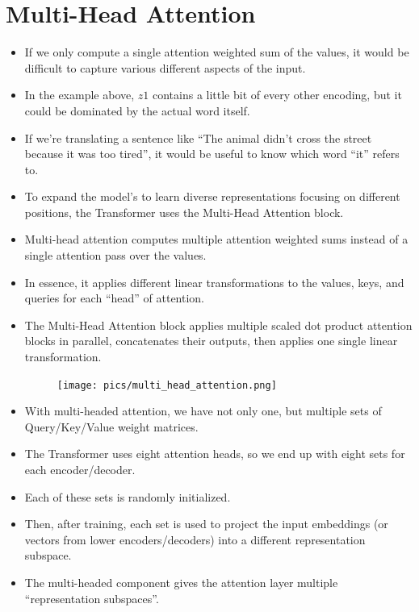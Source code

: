 \section{Multi-Head Attention}
\begin{itemize}
\item If we only compute a single attention weighted sum of the values, it would be difficult to capture various different aspects of the input.
\item In the example above, $z1$ contains a little bit of every other encoding, but it could be dominated by the actual word itself.
\item If we’re translating a sentence like ``The animal didn’t cross the street because it was too tired'', it would be useful to know which word ``it'' refers to.

\item To expand the model's to learn diverse representations focusing on different positions, the Transformer uses the Multi-Head Attention block.

\item Multi-head attention computes multiple attention weighted sums instead of a single attention pass over the values.

\item In essence, it applies different linear transformations to the values, keys, and queries for each ``head'' of attention.
\item The Multi-Head Attention block applies multiple scaled dot product attention blocks in parallel, concatenates their outputs, then applies one single linear transformation.
 
 
     \begin{figure}[h]
        	\texttt{[image: pics/multi\_head\_attention.png]}
        \end{figure}  
 
\item With multi-headed attention, we have not only one, but multiple sets of Query/Key/Value weight matrices.
\item The Transformer uses eight attention heads, so we end up with eight sets for each encoder/decoder.
\item Each of these sets is randomly initialized.
\item Then, after training, each set is used to project the input embeddings (or vectors from lower encoders/decoders) into a different representation subspace.
 
\item The multi-headed component gives the attention layer multiple ``representation subspaces''. 
 

\end{itemize}
